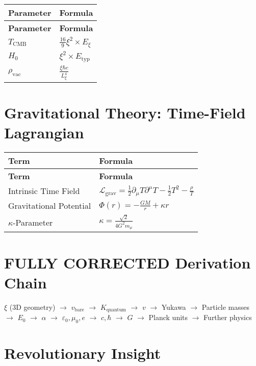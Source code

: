 \documentclass[12pt,a4paper]{article}
\begin{document}
	\begin{longtable}{|p{3cm}|p{4cm}|}
		\hline
		\textbf{Parameter} & \textbf{Formula} \\
		\hline
		\endfirsthead
		\hline
		\textbf{Parameter} & \textbf{Formula} \\
		\hline
		\endhead
		\(T_{\text{CMB}}\) & \(\frac{16}{9}\xi^{2} \times E_{\xi}\) \\
		\hline
		\(H_0\) & \(\xi^{2} \times E_{\text{typ}}\) \\
		\hline
		\(\rho_{\text{vac}}\) & \(\frac{\xi\hbar c}{L_{\xi}^{4}}\) \\
		\hline
	\end{longtable}
	
	\section{Gravitational Theory: Time-Field Lagrangian}
	
	\begin{longtable}{|p{4cm}|p{5cm}|}
		\hline
		\textbf{Term} & \textbf{Formula} \\
		\hline
		\endfirsthead
		\hline
		\textbf{Term} & \textbf{Formula} \\
		\hline
		\endhead
		Intrinsic Time Field & \(\mathcal{L}_{\text{grav}} = \frac{1}{2}\partial_{\mu}T\partial^{\mu}T - \frac{1}{2}T^{2} - \frac{\rho}{T}\) \\
		\hline
		Gravitational Potential & \(\Phi(r) = -\frac{GM}{r} + \kappa r\) \\
		\hline
		\(\kappa\)-Parameter & \(\kappa = \frac{\sqrt{2}}{4G^{2}m_{\mu}}\) \\
		\hline
	\end{longtable}
	
	\section{FULLY CORRECTED Derivation Chain}
	
	\begin{center}
		\(\xi\) (3D geometry) \(\rightarrow\) \(v_{\text{bare}}\) \(\rightarrow\) \(K_{\text{quantum}}\) \(\rightarrow\) \(v\) \(\rightarrow\) Yukawa \(\rightarrow\) Particle masses \(\rightarrow\) \(E_0\) \(\rightarrow\) \(\alpha\) \(\rightarrow\) \(\varepsilon_0, \mu_0, e\) \(\rightarrow\) \(c, \hbar\) \(\rightarrow\) \(G\) \(\rightarrow\) Planck units \(\rightarrow\) Further physics
	\end{center}
	
	\section{Revolutionary Insight}
	
\end{document}
